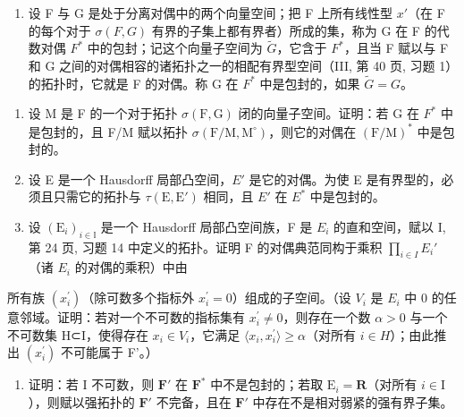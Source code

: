 \begin{enumerate}
\def\labelenumi{\arabic{enumi})}
\setcounter{enumi}{15}
\tightlist
\item
  设 F 与 G 是处于分离对偶中的两个向量空间；把 F 上所有线性型 \(x'\)（在 F 的每个对于 \(\sigma(F, G)\) 有界的子集上都有界者）所成的集，称为 G 在 F 的代数对偶 \(F^{*}\) 中的包封；记这个向量子空间为 \(\tilde{G}\)，它含于 \(F^{*}\)，且当 F 赋以与 F 和 G 之间的对偶相容的诸拓扑之一的相配有界型空间（III, 第 40 页, 习题 1）的拓扑时，它就是 F 的对偶。称 G 在 \(F^{*}\) 中是包封的，如果 \(\tilde{G} = G\)。
\end{enumerate}

\begin{enumerate}
\def\labelenumi{\alph{enumi})}
\tightlist
\item
  设 M 是 F 的一个对于拓扑 \(\sigma(\mathrm{F},\mathrm{G})\) 闭的向量子空间。证明：若 G 在 \(F^{*}\) 中是包封的，且 F/M 赋以拓扑 \(\sigma(\mathrm{F}/\mathrm{M},\mathrm{M}^{\circ})\)，则它的对偶在 \((\mathrm{F}/\mathrm{M})^{*}\) 中是包封的。
\item
  设 E 是一个 Hausdorff 局部凸空间，\(E'\) 是它的对偶。为使 E 是有界型的，必须且只需它的拓扑与 \(\tau(\mathrm{E},\mathrm{E}')\) 相同，且 \(E'\) 在 \(E^{*}\) 中是包封的。
\item
  设 \((\mathrm{E}_{i})_{i\in\mathbb{I}}\) 是一个 Hausdorff 局部凸空间族，F 是 \(E_{i}\) 的直和空间，赋以 I, 第 24 页, 习题 14 中定义的拓扑。证明 F 的对偶典范同构于乘积 \(\prod_{i\in I}E_{i}'\)（诸 \(E_{i}\) 的对偶的乘积）中由
\end{enumerate}

所有族 \((x_{i}^{\prime})\)（除可数多个指标外 \(x_{i}^{\prime}=0\)）组成的子空间。（设 \(V_{i}\) 是 \(E_{i}\) 中 0 的任意邻域。证明：若对一个不可数的指标集有 \(x_{i}^{\prime}\neq0\)，则存在一个数 \(\alpha>0\) 与一个不可数集 H⊂I，使得存在 \(x_{i}\in V_{i}\)，它满足 \(\langle x_{i},x_{i}^{\prime}\rangle\geqslant\alpha\)（对所有 \(i\in H\)）；由此推出 \((x_{i}^{\prime})\) 不可能属于 F'。）

\begin{enumerate}
\def\labelenumi{\alph{enumi})}
\setcounter{enumi}{3}
\tightlist
\item
  证明：若 I 不可数，则 \(\mathbf{F}'\) 在 \(\mathbf{F}^*\) 中不是包封的；若取 \(\mathrm{E}_i = \mathbf{R}\)（对所有 \(i \in \mathrm{I}\)），则赋以强拓扑的 \(\mathbf{F}'\) 不完备，且在 \(\mathbf{F}'\) 中存在不是相对弱紧的强有界子集。
\end{enumerate}

